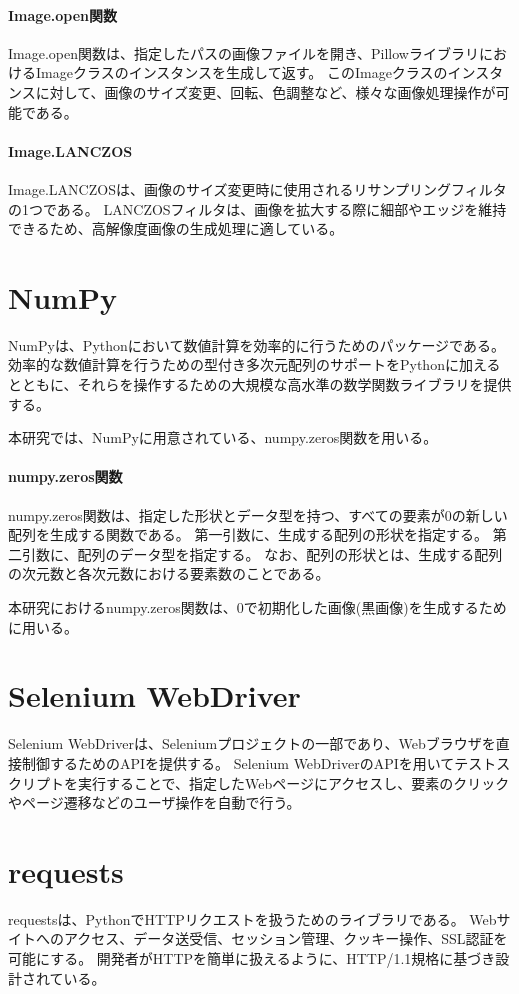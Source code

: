 \paragraph{Image.open関数}
Image.open関数は、指定したパスの画像ファイルを開き、PillowライブラリにおけるImageクラスのインスタンスを生成して返す。
このImageクラスのインスタンスに対して、画像のサイズ変更、回転、色調整など、様々な画像処理操作が可能である。
\paragraph{Image.LANCZOS}
Image.LANCZOSは、画像のサイズ変更時に使用されるリサンプリングフィルタの1つである。
LANCZOSフィルタは、画像を拡大する際に細部やエッジを維持できるため、高解像度画像の生成処理に適している。
\par

\section{NumPy}\label{sec:numpy}
NumPy\cite{NumPy}は、Pythonにおいて数値計算を効率的に行うためのパッケージである。
効率的な数値計算を行うための型付き多次元配列のサポートをPythonに加えるとともに、それらを操作するための大規模な高水準の数学関数ライブラリを提供する。
\par
本研究では、NumPyに用意されている、numpy.zeros関数\cite{np.zeros}を用いる。
\paragraph{numpy.zeros関数}
numpy.zeros関数は、指定した形状とデータ型を持つ、すべての要素が$0$の新しい配列を生成する関数である。
第一引数に、生成する配列の形状を指定する。
第二引数に、配列のデータ型を指定する。
なお、配列の形状とは、生成する配列の次元数と各次元数における要素数のことである。
\par
本研究におけるnumpy.zeros関数は、$0$で初期化した画像(黒画像)を生成するために用いる。

\section{Selenium WebDriver}\label{sec:Selenium_WebDriver}
Selenium WebDriver\cite{SeleniumWebDriver}は、Seleniumプロジェクト\cite{Selenium}の一部であり、Webブラウザを直接制御するためのAPIを提供する。
Selenium WebDriverのAPIを用いてテストスクリプトを実行することで、指定したWebページにアクセスし、要素のクリックやページ遷移などのユーザ操作を自動で行う。

\section{requests}\label{sec:requests}
requests\cite{Requests}は、PythonでHTTPリクエストを扱うためのライブラリである。
Webサイトへのアクセス、データ送受信、セッション管理、クッキー操作、SSL認証を可能にする。
開発者がHTTPを簡単に扱えるように、HTTP/1.1\cite{HTTP}規格に基づき設計されている。

